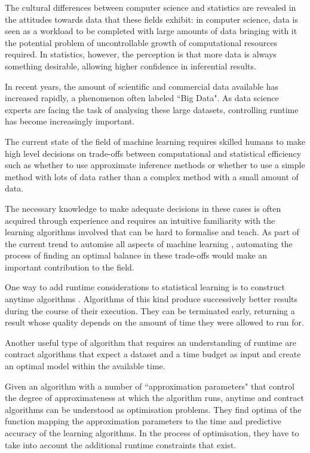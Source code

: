 \documentclass[a4paper,12pt,twoside,openright]{report}
\begin{document}
The cultural differences between computer science and statistics are revealed in the attitudes towards data that these fields exhibit: in computer science, data is seen as a workload to be completed with large amounts of data bringing with it the potential problem of uncontrollable growth of computational resources required. In statistics, however, the perception is that more data is always something desirable, allowing higher confidence in inferential results.

In recent years, the amount of scientific and commercial data available has increased rapidly, a phenomenon often labeled ``Big Data". As data science experts are facing the task of analysing these large datasets, controlling runtime has become increasingly important.

The current state of the field of machine learning requires skilled humans to make high level decisions on trade-offs between computational and statistical efficiency such as whether to use approximate inference methods or whether to use a simple method with lots of data rather than a complex method with a small amount of data. 

The necessary knowledge to make adequate decisions in these cases is often acquired through experience and requires an intuitive familiarity with the learning algorithms involved that can be hard to formalise and teach. As part of the current trend to automise all aspects of machine learning \cite{Lloyd2014-ABCD}, automating the process of finding an optimal balance in these trade-offs would make an important contribution to the field.

One way to add runtime considerations to statistical learning is to construct anytime algorithms \cite{conf/aaai/DeanB88}. Algorithms of this kind produce successively better results during the course of their execution. They can be terminated early, returning a result whose quality depends on the amount of time they were allowed to run for.

Another useful type of algorithm that requires an understanding of runtime are contract algorithms \cite{ZCCijcai99} that expect a dataset and a time budget as input and create an optimal model within the available time.

Given an algorithm with a number of ``approximation parameters" that control the degree of approximateness at which the algorithm runs, anytime and contract algorithms can be understood as optimisation problems. They find optima of the function mapping the approximation parameters to the time and predictive accuracy of the learning algorithms. In the process of optimisation, they have to take into account the additional runtime constraints that exist.
\end{document}
